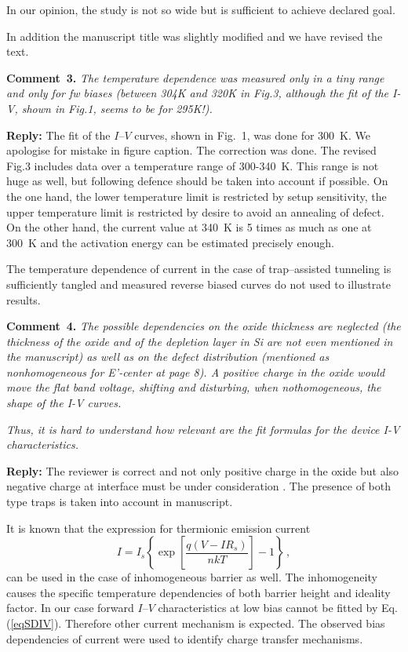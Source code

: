 \documentclass[aip,jap,preprint]{revtex4-1}
\begin{document}
In our opinion, the study is not so wide but is sufficient to achieve declared goal.

In addition the manuscript title was slightly modified and we have revised the text.


\noindent
\textcolor[rgb]{0.00,0.50,1.00}{\textbf{Comment~3.}}
\emph{The temperature dependence was measured only in a tiny range and only for fw biases (between 304K and 320K in Fig.3, although the fit of the I-V, shown in Fig.1, seems to be for 295K!).}


\noindent
\textcolor[rgb]{0.51,0.00,0.00}{\textbf{Reply:}}
The fit of the $I$--$V$ curves, shown in Fig.~1, was done for 300~K.
We apologise for mistake in figure caption.
The correction was done.
The revised Fig.3 includes data over a temperature range of 300-340~K.
This range is not huge as well, but following defence should be taken into account if possible.
On the one hand, the lower temperature limit is restricted by setup sensitivity,
the upper temperature limit is restricted by desire to avoid an annealing of defect.
On the other hand, the current value at 340~K is 5 times as much as one at 300~K
and the activation energy can be estimated precisely enough.

The temperature dependence of current in the case of  trap--assisted tunneling is sufficiently tangled \cite{TAT:Gilmore,TAT:GopalSST,TAT:Gopal} and
measured reverse biased curves do not used to illustrate  results.


\noindent
\textcolor[rgb]{0.00,0.50,1.00}{\textbf{Comment~4.}}
\emph{The possible dependencies on the oxide thickness are neglected (the thickness of the oxide and of the depletion layer in Si are not even mentioned in the manuscript) as well as on the defect distribution (mentioned as nonhomogeneous for E’-center at page 8). A positive charge in the oxide would move the flat band voltage, shifting and disturbing, when nothomogeneous, the shape of the I-V curves.}

\emph{Thus, it is hard to understand how relevant are the fit formulas for the device I-V characteristics.}


\noindent
\textcolor[rgb]{0.51,0.00,0.00}{\textbf{Reply:}}
The reviewer is correct and not only positive charge in the oxide but also  negative charge at interface must be under consideration  \cite{SiO2:Devine,SiO2:Lenahan}.
The presence of both type traps is taken into account in manuscript.

It is known \cite{Tung:MSE,Tung:PhysRev} that the expression for thermionic emission current
\begin{equation}
\label{eqSDIV}
I=I_s\left\{\exp\left[\frac{q(V-IR_s)}{nkT}\right]-1\right\}\,,
\end{equation}
can be used in the case of inhomogeneous barrier as well.
The inhomogeneity causes the specific temperature dependencies of both barrier height and ideality factor.
In our case forward $I$--$V$ characteristics at low bias cannot be fitted by Eq.(\ref{eqSDIV}).
Therefore other current mechanism is expected.
The observed bias dependencies of current were used to identify charge transfer mechanisms.
\end{document}
